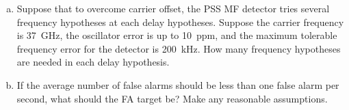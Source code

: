 \documentclass[11pt]{article}
\begin{document}
\begin{enumerate}
\begin{enumerate}[(a)]
\item Suppose that to overcome carrier offset, the PSS MF detector
tries several frequency hypotheses at each delay hypotheses.
Suppose the carrier frequency is \SI{37}{GHz}, the oscillator error is up to 10~ppm,
and the maximum tolerable frequency error for the detector is \SI{200}{kHz}.
How many frequency hypotheses are needed in each delay hypothesis.

\item If the average number of false alarms should be less than one
false alarm per second, what should the FA target be?
Make any reasonable assumptions.
\end{enumerate}

\end{enumerate}
\end{document}
